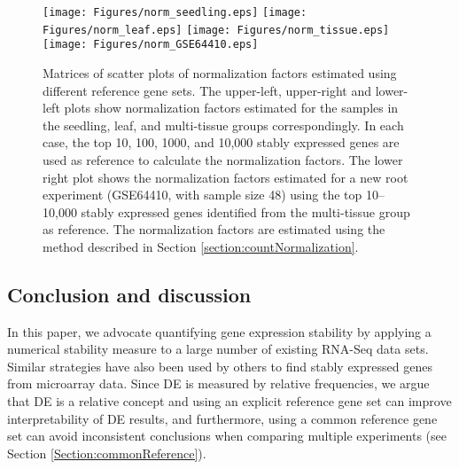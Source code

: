 			\begin{figure}[!ht]
				\begin{center}
					\texttt{[image: Figures/norm\_seedling.eps]}
					\texttt{[image: Figures/norm\_leaf.eps]}
					\texttt{[image: Figures/norm\_tissue.eps]}
					\texttt{[image: Figures/norm\_GSE64410.eps]}
					\caption[Matrices of scatter plots of normalization factors
					estimated using different reference gene sets]{Matrices of scatter plots of 
					normalization factors
						estimated using different reference gene sets. 
						The upper-left, upper-right and lower-left plots show
						normalization factors estimated for the samples in the
						seedling, leaf, and multi-tissue groups correspondingly. 
						In each case, the top 10, 100, 1000, and 10,000 stably
						expressed genes are used as reference to
						calculate the normalization factors.
						The lower right plot shows the normalization factors estimated for a new 
						root
						experiment (GSE64410, with sample size 48) using the top 10--10,000
						stably expressed genes identified from the multi-tissue group as
						reference. The normalization factors are estimated using the
						method described in Section \ref{section:countNormalization}.}
					\label{fig:normfactor} \end{center} \end{figure}
			
			\subsection{Conclusion and discussion}\label{section:discussion}
			
			In this paper, we advocate quantifying gene expression stability by applying a
			numerical stability measure to a large number of existing RNA-Seq data sets.
			Similar strategies have also been used by others to find stably expressed
			genes from microarray data. Since DE is measured by relative frequencies, we
			argue that DE is a relative concept and using an explicit reference gene set
			can improve interpretability of DE results, and furthermore,  using a common
			reference gene set can avoid inconsistent conclusions when comparing multiple
			experiments (see Section \ref{Section:commonReference}).
			
			
